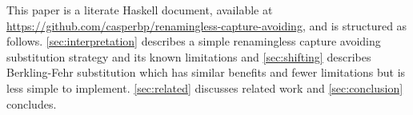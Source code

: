 

This paper is a literate Haskell document, available at \url{https://github.com/casperbp/renamingless-capture-avoiding}, and is structured as follows.
\cref{sec:interpretation} describes a simple renamingless capture avoiding substitution strategy and its known limitations and \cref{sec:shifting} describes Berkling-Fehr substitution which has similar benefits and fewer limitations but is less simple to implement.
\cref{sec:related} discusses related work and \cref{sec:conclusion} concludes.


